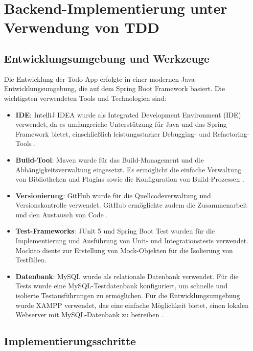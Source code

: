 \chapter{Backend-Implementierung unter Verwendung von TDD}

\section{Entwicklungsumgebung und Werkzeuge}

Die Entwicklung der Todo-App erfolgte in einer modernen Java-Entwicklungsumgebung, die auf dem Spring Boot Framework basiert. Die wichtigsten verwendeten Tools und Technologien sind:

\begin{itemize}
	\item \textbf{IDE}: IntelliJ IDEA wurde als Integrated Development Environment (IDE) verwendet, da es umfangreiche Unterstützung für Java und das Spring Framework bietet, einschließlich leistungsstarker Debugging- und Refactoring-Tools \cite{noauthor_intellij_nodate}. 
	\item \textbf{Build-Tool}: Maven wurde für das Build-Management und die Abhängigkeitsverwaltung eingesetzt. Es ermöglicht die einfache Verwaltung von Bibliotheken und Plugins sowie die Konfiguration von Build-Prozessen \cite{noauthor_maven_nodate}. 
	\item \textbf{Versionierung}: GitHub wurde für die Quellcodeverwaltung und Versionskontrolle verwendet. GitHub ermöglichte zudem die Zusammenarbeit und den Austausch von Code \cite{noauthor_build_2024}.
	\item \textbf{Test-Frameworks}: JUnit 5 und Spring Boot Test wurden für die Implementierung und Ausführung von Unit- und Integrationstests verwendet. Mockito diente zur Erstellung von Mock-Objekten für die Isolierung von Testfällen.
	\item \textbf{Datenbank}: MySQL wurde als relationale Datenbank verwendet. Für die Tests wurde eine MySQL-Testdatenbank konfiguriert, um schnelle und isolierte Testausführungen zu ermöglichen. Für die Entwicklungsumgebung wurde XAMPP verwendet, das eine einfache Möglichkeit bietet, einen lokalen Webserver mit MySQL-Datenbank zu betreiben \cite{noauthor_xampp_nodate}.

\end{itemize}

\section{Implementierungsschritte}

